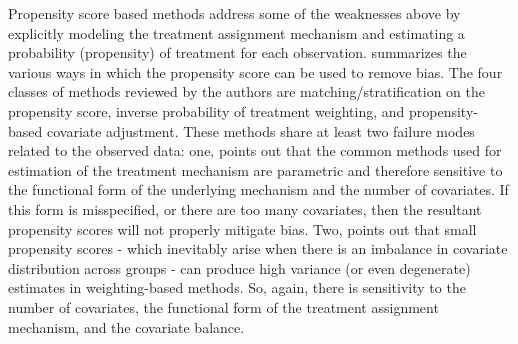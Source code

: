 \documentclass[../main.tex]{subfiles}
\begin{document}
\vspace{\baselineskip}
Propensity score based methods address some of the weaknesses above by explicitly modeling the treatment assignment mechanism and estimating a probability (propensity) of treatment for each observation. \cite{Austin2011AnStudies} summarizes the various ways in which the propensity score can be used to remove bias. The four classes of methods reviewed by the authors are matching/stratification on the propensity score, inverse probability of treatment weighting, and propensity-based covariate adjustment. These methods share at least two failure modes related to the observed data: one, \cite{Hill2011BayesianInference} points out that the common methods used for estimation of the treatment mechanism are parametric and therefore sensitive to the functional form of the underlying mechanism and the number of covariates. If this form is misspecified, or there are too many covariates, then the resultant propensity scores will not properly mitigate bias. Two, \cite{Knaus2018MachineEvidence} points out that small propensity scores - which inevitably arise when there is an imbalance in covariate distribution across groups - can produce high variance (or even degenerate) estimates in weighting-based methods. So, again, there is sensitivity to the number of covariates, the functional form of the treatment assignment mechanism, and the covariate balance.\par
\end{document}
